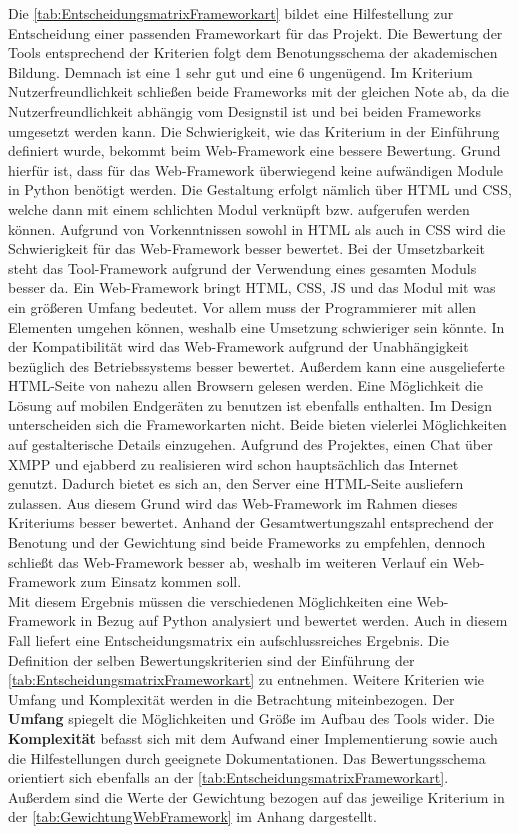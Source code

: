 \documentclass[a4paper,titlepage,halfparskip,12pt]{scrreprt}
\begin{document}
\begin{onehalfspacing}
Die \autoref{tab:EntscheidungsmatrixFrameworkart} bildet eine Hilfestellung zur Entscheidung einer passenden Frameworkart für das Projekt. Die Bewertung der Tools entsprechend der Kriterien folgt dem Benotungsschema der akademischen Bildung. Demnach ist eine 1 sehr gut und eine 6 ungenügend. Im Kriterium Nutzerfreundlichkeit schließen beide Frameworks mit der gleichen Note ab, da die Nutzerfreundlichkeit abhängig vom Designstil ist und bei beiden Frameworks umgesetzt werden kann. Die Schwierigkeit, wie das Kriterium in der Einführung definiert wurde, bekommt beim Web-Framework eine bessere Bewertung. Grund hierfür ist, dass für das Web-Framework überwiegend keine aufwändigen Module in Python benötigt werden. Die Gestaltung erfolgt nämlich über \ac{HTML} und \ac{CSS}, welche dann mit einem schlichten Modul verknüpft bzw. aufgerufen werden können. Aufgrund von Vorkenntnissen sowohl in \ac{HTML} als auch in \ac{CSS} wird die Schwierigkeit für das Web-Framework besser bewertet. Bei der Umsetzbarkeit steht das Tool-Framework aufgrund der Verwendung eines gesamten Moduls besser da. Ein Web-Framework bringt \ac{HTML}, \ac{CSS}, \ac{JS} und das Modul mit was ein größeren Umfang bedeutet. Vor allem muss der Programmierer mit allen Elementen umgehen können, weshalb eine Umsetzung schwieriger sein könnte. In der Kompatibilität wird das Web-Framework aufgrund der Unabhängigkeit bezüglich des Betriebssystems besser bewertet. Außerdem kann eine ausgelieferte \ac{HTML}-Seite von nahezu allen Browsern gelesen werden. Eine Möglichkeit die Lösung auf mobilen Endgeräten zu benutzen ist ebenfalls enthalten. Im Design unterscheiden sich die Frameworkarten nicht. Beide bieten vielerlei Möglichkeiten auf gestalterische Details einzugehen. Aufgrund des Projektes, einen Chat über \ac{XMPP} und ejabberd zu realisieren wird schon hauptsächlich das Internet genutzt. Dadurch bietet es sich an, den Server eine \ac{HTML}-Seite ausliefern zulassen. Aus diesem Grund wird das Web-Framework im Rahmen dieses Kriteriums besser bewertet. Anhand der Gesamtwertungszahl entsprechend der Benotung und der Gewichtung sind beide Frameworks zu empfehlen, dennoch schließt das Web-Framework besser ab, weshalb im weiteren Verlauf ein Web-Framework zum Einsatz kommen soll. \cite{FrameworkOverview} \cite{WebFramework}\\ 
Mit diesem Ergebnis müssen die verschiedenen Möglichkeiten eine Web-Framework in Bezug auf Python analysiert und bewertet werden. Auch in diesem Fall liefert eine Entscheidungsmatrix ein aufschlussreiches Ergebnis. Die Definition der selben Bewertungskriterien sind der Einführung der \autoref{tab:EntscheidungsmatrixFrameworkart} zu entnehmen. Weitere Kriterien wie Umfang und Komplexität werden in die Betrachtung miteinbezogen. Der \textbf{Umfang} spiegelt die Möglichkeiten und Größe im Aufbau des Tools wider. Die \textbf{Komplexität} befasst sich mit dem Aufwand einer Implementierung sowie auch die Hilfestellungen durch geeignete Dokumentationen. Das Bewertungsschema orientiert sich ebenfalls an der \autoref{tab:EntscheidungsmatrixFrameworkart}. Außerdem sind die Werte der Gewichtung bezogen auf das jeweilige Kriterium in der \autoref{tab:GewichtungWebFramework} im Anhang dargestellt.

\end{onehalfspacing}
\end{document}
